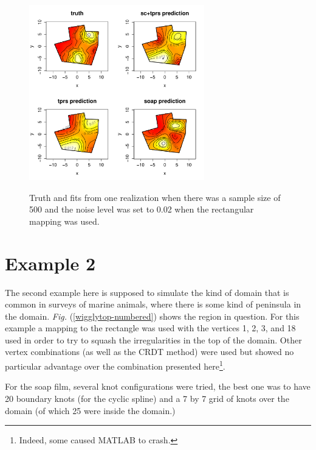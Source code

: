 \documentclass[a4paper,10pt]{amsart}
\newcommand{\Fig}[1]{\emph{Fig.} (\ref{#1})}
\begin{document}
\begin{figure}[tbp]
\centering
\includegraphics[width=3in]{figs-otherdomains/fig9-rect-real.pdf} \\
\caption{Truth and fits from one realization when there was a sample size of 500 and the noise level was set to 0.02 when the rectangular mapping was used. }
\label{fig9-rect-real}
\end{figure}




\section{Example 2}

The second example here is supposed to simulate the kind of domain that is common in surveys of marine animals, where there is some kind of peninsula in the domain. \Fig{wigglytop-numbered} shows the region in question. For this example a mapping to the rectangle was used with the vertices 1, 2, 3, and 18 used in order to try to squash the irregularities in the top of the domain. Other vertex combinations (as well as the CRDT method) were used but showed no particular advantage over the combination presented here\footnote{Indeed, some caused MATLAB to crash.}.




For the soap film, several knot configurations were tried, the best one was to have 20 boundary knots (for the cyclic spline) and a 7 by 7 grid of knots over the domain (of which 25 were inside the domain.) 
\end{document}
